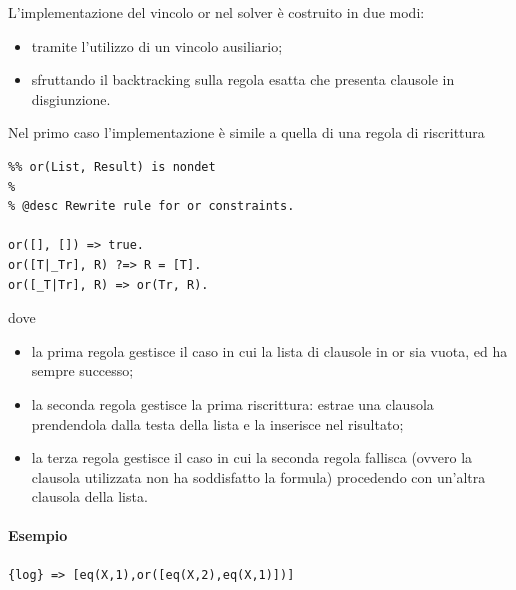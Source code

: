 \documentclass[12pt,a4paper,openright]{book}  %
\begin{document}
L'implementazione del vincolo or nel solver è costruito in due modi:
\begin{itemize}
	\item tramite l'utilizzo di un vincolo ausiliario;
	\item sfruttando il backtracking sulla regola esatta che
          presenta clausole in disgiunzione.
\end{itemize}

Nel primo caso l'implementazione è simile a quella di una regola di
riscrittura
\begin{verbatim}
%% or(List, Result) is nondet
%
% @desc Rewrite rule for or constraints.

or([], []) => true.
or([T|_Tr], R) ?=> R = [T].
or([_T|Tr], R) => or(Tr, R).
\end{verbatim}
dove
\begin{itemize}
	\item la prima regola gestisce il caso in cui la lista di
          clausole in or sia vuota, ed ha sempre successo;
	\item la seconda regola gestisce la prima riscrittura: estrae
          una clausola prendendola dalla testa della lista e la
          inserisce nel risultato;
	\item la terza regola gestisce il caso in cui la seconda
          regola fallisca (ovvero la clausola utilizzata non ha
          soddisfatto la formula) procedendo con un'altra clausola
          della lista.
\end{itemize}

\paragraph{Esempio}
\begin{verbatim}
{log} => [eq(X,1),or([eq(X,2),eq(X,1)])]
\end{verbatim}
\end{document}
